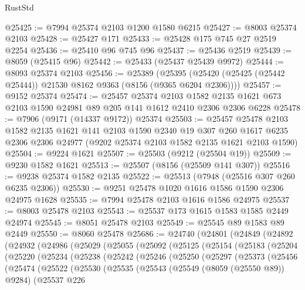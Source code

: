 \begin{lexlean}{RustStd}
\begin{coremodule}
{\begin{coremodule}
{{{{{{{{{{{{{{{{{{{{{{{{{{{{{{{{{{@25425 := @7994 @25374 @2103 @1200 @1580 @6215
@25427 := @8003 @25374 @2103
@25428 := @25427 @171
@25433 := @25428 @175 @745 @27 @2519 @2254
@25436 := @25410 @96 @745 @96
@25437 := @25436 @2519
@25439 := @8059 (@25415 @96)
@25442 := @25433 (@25437 @25439 @9972)
@25444 := @8093 @25374 @2103
@25456 := @25389
    (@25395 (@25420 (@25425 (@25442 @25444)) @21530 @8162 @9363 (@8156 (@9365 @6204 @2306))))
@25457 := @9152 @25374
@25474 := @25457
    @25374
    @2103
    @1582
    @2135
    @1621
    @673
    @2103
    @1590
    @24981
    @89
    @205
    @141
    @1612
    @2410
    @2306
    @2306
    @6228
@25478 := @7906 (@9171 (@14337 @9172)) @25374
@25503 := @25457
    @25478
    @2103
    @1582
    @2135
    @1621
    @141
    @2103
    @1590
    @2340
    @19
    @307
    @260
    @1617
    @6235
    @2306
    @2306
    @24977
    (@9202 @25374 @2103 @1582 @2135 @1621 @2103 @1590)
@25504 := @9224 @1621
@25507 := @25503 (@9212 (@25504 @19))
@25509 := @9230 @1582 @1621
@25513 := @25507 (@8156 (@25509 @141 @307))
@25516 := @9238 @25374 @1582 @2135
@25522 := @25513 (@7948 (@25516 @307 @260 @6235 @2306))
@25530 := @9251 @25478 @1020 @1616 @1586 @1590 @2306 @24975 @1628
@25535 := @7994 @25478 @2103 @1616 @1586 @24975
@25537 := @8003 @25478 @2103
@25543 := @25537 @173 @1615 @1583 @1585 @2449 @24974
@25545 := @8051 @25478 @2103
@25549 := @25545 @89 @1583 @89 @2449
@25550 := @8060 @25478
@25686 := @24740
    (@24801
      (@24849
        (@24892
          (@24932
            (@24986
              (@25029
                (@25055
                  (@25092
                    (@25125
                      (@25154
                        (@25183
                          (@25204
                            (@25220
                              (@25234
                                (@25238
                                  (@25242
                                    (@25246
                                      (@25250
                                        (@25297
                                          (@25373
                                            (@25456
                                              (@25474
                                                (@25522
                                                  (@25530
                                                    (@25535
                                                      (@25543
                                                        (@25549 (@8059 (@25550 @89)) @9284)
                                                        (@25537
                                                          @226
}}}}}}}}}}}}}}}}}}}}}}}}}}}}}}}}}}
\end{coremodule}}
\end{coremodule}
\end{lexlean}
